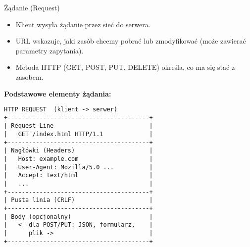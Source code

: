 \documentclass[10pt,compress,usenames,dvipsnames,aspectratio=169]{beamer}
\begin{document}
\begin{frame}[fragile]{Żądanie (Request)}
  \begin{itemize}
    \item Klient wysyła żądanie przez sieć do serwera.
    \item URL wskazuje, jaki zasób chcemy pobrać lub zmodyfikować (może zawierać parametry zapytania).
    \item Metoda HTTP (GET, POST, PUT, DELETE) określa, co ma się stać z zasobem.
  \end{itemize}

  \vspace{1ex}
  \textbf{Podstawowe elementy żądania:}
  \begin{center}
    \begin{minipage}{0.6\textwidth}
      \begin{lstlisting}[style=dark, basicstyle=\ttfamily\scriptsize\color{fgcode}, numbers=none, xleftmargin=1em, xrightmargin=1em]
HTTP REQUEST  (klient -> serwer)
+----------------------------------------+
| Request-Line                           |
|   GET /index.html HTTP/1.1             |
+----------------------------------------+
| Nagłówki (Headers)                     |
|   Host: example.com                    |
|   User-Agent: Mozilla/5.0 ...          |
|   Accept: text/html                    |
|   ...                                  |
+----------------------------------------+
| Pusta linia (CRLF)                     |
+----------------------------------------+
| Body (opcjonalny)                      |
|   <- dla POST/PUT: JSON, formularz,    |
|      plik ->                           |
+----------------------------------------+
      \end{lstlisting}
    \end{minipage}
  \end{center}
 
\end{frame}
\end{document}
